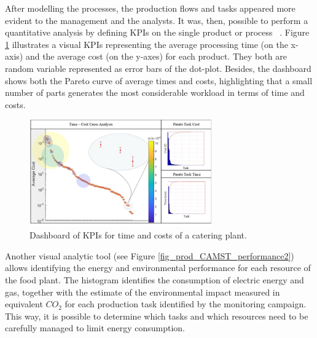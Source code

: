 After modelling the processes, the production flows and tasks appeared more evident to the management and the analysts. It was, then, possible to perform a quantitative analysis by defining KPIs on the single product or process ~\cite{Tufano2018}. Figure \ref{fig_prod_CAMST_performance1} illustrates a visual KPIs representing the average processing time (on the x-axis) and the average cost (on the y-axes) for each product. They both are random variable represented as error bars of the dot-plot. Besides, the dashboard shows both the Pareto curve of average times and costs, highlighting that a small number of parts generates the most considerable workload in terms of time and costs.

\begin{figure}[hbt!]
\centering
\includegraphics[width=0.7\textwidth]{sectionProduction/control_figures/fig_prod_CAMST_performance1.png}
\captionsetup{type=figure}
\caption{Dashboard of KPIs for time and costs of a catering plant.}
\label{fig_prod_CAMST_performance1}
\end{figure}

Another visual analytic tool (see Figure \ref{fig_prod_CAMST_performance2}) allows identifying the energy and environmental performance for each resource of the food plant. The histogram identifies the consumption of electric energy and gas, together with the estimate of the environmental impact measured in equivalent $CO_2$ for each production task identified by the monitoring campaign. This way, it is possible to determine which tasks and which resources need to be carefully managed to limit energy consumption.

